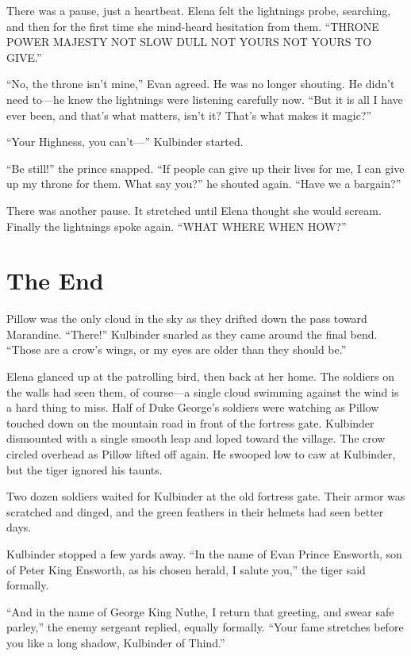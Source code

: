 \documentclass[10pt]{book}
\begin{document}
There was a pause, just a heartbeat. Elena felt the lightnings probe, searching, and then for the first time she mind-heard hesitation from them. ``THRONE POWER MAJESTY NOT SLOW DULL NOT YOURS NOT YOURS TO GIVE.''

``No, the throne isn't mine,'' Evan agreed. He was no longer shouting. He didn't need to---he knew the lightnings were listening carefully now. ``But it is all I have ever been, and that's what matters, isn't it? That's what makes it magic?''

``Your Highness, you can't---'' Kulbinder started.

``Be still!'' the prince snapped. ``If people can give up their lives for me, I can give up my throne for them. What say you?'' he shouted again. ``Have we a bargain?''

There was another pause. It stretched until Elena thought she would scream. Finally the lightnings spoke again. ``WHAT WHERE WHEN HOW?''

\chapter{The End}

Pillow was the only cloud in the sky as they drifted down the pass toward Marandine.  ``There!'' Kulbinder snarled as they came around the final bend.  ``Those are a crow's wings, or my eyes are older than they should be.''

Elena glanced up at the patrolling bird, then back at her home.  The soldiers on the walls had seen them, of course---a single cloud swimming against the wind is a hard thing to miss. Half of Duke George's soldiers were watching as Pillow touched down on the mountain road in front of the fortress gate. Kulbinder dismounted with a single smooth leap and loped toward the village. The crow circled overhead as Pillow lifted off again. He swooped low to caw at Kulbinder, but the tiger ignored his taunts.

Two dozen soldiers waited for Kulbinder at the old fortress gate. Their armor was scratched and dinged, and the green feathers in their helmets had seen better days.

Kulbinder stopped a few yards away. ``In the name of Evan Prince Ensworth, son of Peter King Ensworth, as his chosen herald, I salute you,'' the tiger said formally.

``And in the name of George King Nuthe, I return that greeting, and swear safe parley,'' the enemy sergeant replied, equally formally. ``Your fame stretches before you like a long shadow, Kulbinder of Thind.''
\end{document}
